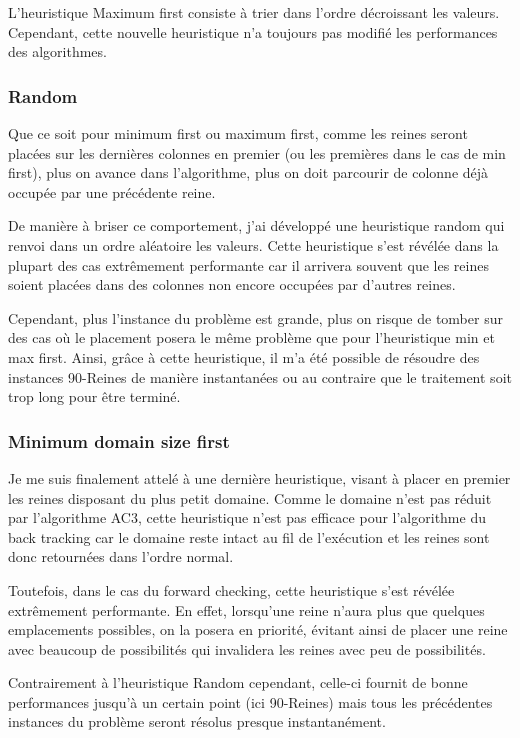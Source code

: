 \documentclass[a4paper,10pt]{article}
\begin{document}
L'heuristique Maximum first consiste à trier dans l'ordre décroissant les valeurs. Cependant, cette nouvelle heuristique n'a toujours pas modifié les performances des algorithmes.

\subsubsection{Random}

Que ce soit pour minimum first ou maximum first, comme les reines seront placées sur les dernières colonnes en premier (ou les premières dans le cas de min first), plus on avance dans l'algorithme, plus on doit parcourir de colonne déjà occupée par une précédente reine.

De manière à briser ce comportement, j'ai développé une heuristique random qui renvoi dans un ordre aléatoire les valeurs. Cette heuristique s'est révélée dans la plupart des cas extrêmement performante car il arrivera souvent que les reines soient placées dans des colonnes non encore occupées par d'autres reines.

Cependant, plus l'instance du problème est grande, plus on risque de tomber sur des cas où le placement posera le même problème que pour l'heuristique min et max first. Ainsi, grâce à cette heuristique, il m'a été possible de résoudre des instances 90-Reines de manière instantanées ou au contraire que le traitement soit trop long pour être terminé.

\subsubsection{Minimum domain size first}

Je me suis finalement attelé à une dernière heuristique, visant à placer en premier les reines disposant du plus petit domaine. Comme le domaine n'est pas réduit par l'algorithme AC3, cette heuristique n'est pas efficace pour l'algorithme du back tracking car le domaine reste intact au fil de l'exécution et les reines sont donc retournées dans l'ordre normal.

Toutefois, dans le cas du forward checking, cette heuristique s'est révélée extrêmement performante. En effet, lorsqu'une reine n'aura plus que quelques emplacements possibles, on la posera en priorité, évitant ainsi de placer une reine avec beaucoup de possibilités qui invalidera les reines avec peu de possibilités.

Contrairement à l'heuristique Random cependant, celle-ci fournit de bonne performances jusqu'à un certain point (ici 90-Reines) mais tous les précédentes instances du problème seront résolus presque instantanément.
\end{document}
